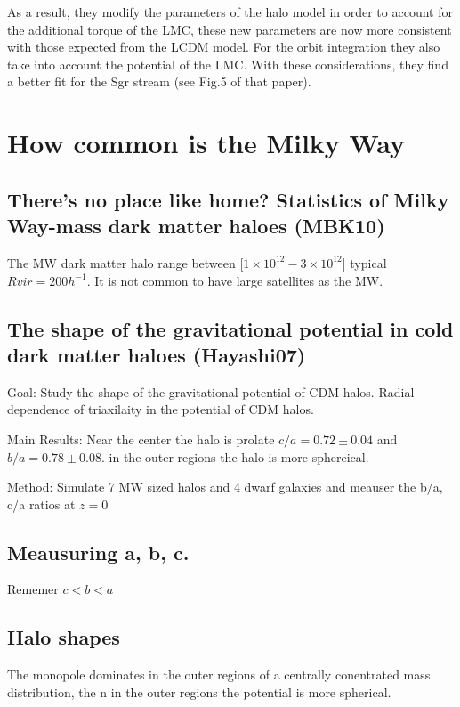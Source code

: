 \documentclass[12pt]{article}
\begin{document}
As a result, they modify the parameters of the halo model in order to account
for the additional torque of the LMC, these new parameters are now more consistent
 with those expected from the LCDM model. For the orbit integration they also take
into account the potential of the LMC. With these considerations, they find a better fit for  the Sgr
stream (see Fig.5 of that paper).

\section{How common is the Milky Way}

\subsection{There’s no place like home? Statistics of Milky Way-mass dark matter
haloes (MBK10)}

The MW dark matter halo range between [$1\times 10^{12} - 3\times 10^{12}$]
typical $Rvir = 200 h^{-1}$. It is not common to have large satellites as
the MW. 

\subsection{The shape of the gravitational potential in cold dark matter haloes (Hayashi07)}

Goal: Study the shape of the gravitational potential of CDM halos. Radial dependence of triaxilaity in the potential of CDM halos.
 
Main Results: Near the center the halo is prolate $c/a = 0.72 \pm 0.04$
and $b/a = 0.78 \pm 0.08$. in the outer regions the halo is more sphereical.

Method: Simulate 7 MW sized halos and 4 dwarf galaxies and meauser the b/a, c/a ratios at $z=0$
\subsection{Meausuring a, b, c.}

Rememer $c<b<a$

\subsection{Halo shapes}

The monopole dominates in the outer regions of a centrally conentrated mass distribution, the n in the outer
regions the potential is more spherical. 
\end{document}
